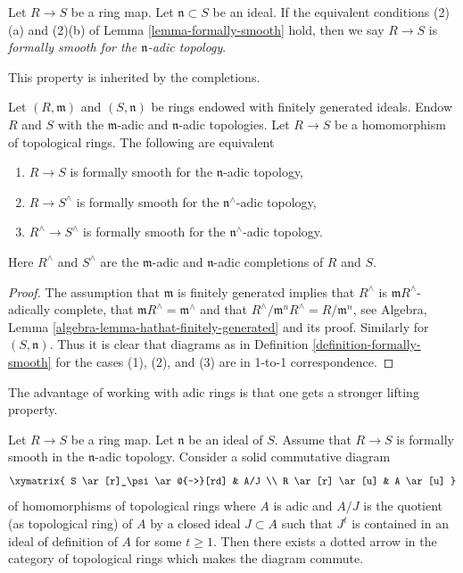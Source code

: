\begin{definition}
\label{definition-formally-smooth-adic}
Let $R \to S$ be a ring map. Let $\mathfrak n \subset S$ be an
ideal. If the equivalent conditions (2)(a) and (2)(b) of
Lemma \ref{lemma-formally-smooth} hold, then we say
$R \to S$ is {\it formally smooth for the $\mathfrak n$-adic topology}.
\end{definition}

\noindent
This property is inherited by the completions.

\begin{lemma}
\label{lemma-formally-smooth-completion}
Let $(R, \mathfrak m)$ and $(S, \mathfrak n)$ be rings endowed
with finitely generated ideals. Endow $R$ and $S$ with the
$\mathfrak m$-adic and $\mathfrak n$-adic topologies.
Let $R \to S$ be a homomorphism of topological rings.
The following are equivalent
\begin{enumerate}
\item $R \to S$ is formally smooth for the $\mathfrak n$-adic topology,
\item $R \to S^\wedge$ is formally smooth for the $\mathfrak n^\wedge$-adic
topology,
\item $R^\wedge \to S^\wedge$ is formally smooth for the
$\mathfrak n^\wedge$-adic topology.
\end{enumerate}
Here $R^\wedge$ and $S^\wedge$ are the $\mathfrak m$-adic and
$\mathfrak n$-adic completions of $R$ and $S$.
\end{lemma}

\begin{proof}
The assumption that $\mathfrak m$ is finitely generated implies that
$R^\wedge$ is $\mathfrak mR^\wedge$-adically complete, that
$\mathfrak mR^\wedge = \mathfrak m^\wedge$ and that
$R^\wedge/\mathfrak m^nR^\wedge = R/\mathfrak m^n$,
see Algebra, Lemma \ref{algebra-lemma-hathat-finitely-generated}
and its proof. Similarly for $(S, \mathfrak n)$. Thus it is clear that
diagrams as in Definition \ref{definition-formally-smooth}
for the cases (1), (2), and (3) are in 1-to-1 correspondence.
\end{proof}

\noindent
The advantage of working with adic rings is that one gets a
stronger lifting property.

\begin{lemma}
\label{lemma-lift-continuous}
Let $R \to S$ be a ring map. Let $\mathfrak n$ be an ideal of $S$.
Assume that $R \to S$ is formally smooth in the $\mathfrak n$-adic
topology. Consider a solid commutative diagram
$$
\xymatrix{
S \ar[r]_\psi \ar@{-->}[rd] & A/J \\
R \ar[r] \ar[u] & A \ar[u]
}
$$
of homomorphisms of topological rings where $A$ is adic
and $A/J$ is the quotient (as topological ring) of $A$ by a closed ideal
$J \subset A$ such that $J^t$ is contained in an ideal of definition
of $A$ for some $t \geq 1$. Then there exists a dotted arrow in the category of
topological rings which makes the diagram commute.
\end{lemma}

